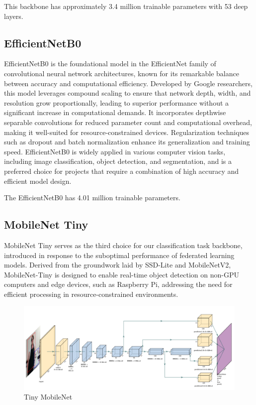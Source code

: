 \documentclass[runningheads,a4paper,11pt]{report}
\begin{document}
This backbone has approximately 3.4 million trainable parameters with 53 deep layers.
\subsection{EfficientNetB0}

EfficientNetB0 is the foundational model in the EfficientNet family of convolutional neural network architectures, known for its remarkable balance between accuracy and computational efficiency. Developed by Google researchers, this model leverages compound scaling to ensure that network depth, width, and resolution grow proportionally, leading to superior performance without a significant increase in computational demands. It incorporates depthwise separable convolutions for reduced parameter count and computational overhead, making it well-suited for resource-constrained devices. Regularization techniques such as dropout and batch normalization enhance its generalization and training speed. EfficientNetB0 is widely applied in various computer vision tasks, including image classification, object detection, and segmentation, and is a preferred choice for projects that require a combination of high accuracy and efficient model design.

The EfficientNetB0 has 4.01 million trainable parameters.

\subsection{MobileNet Tiny}

MobileNet Tiny serves as the third choice for our classification task backbone, introduced in response to the suboptimal performance of federated learning models. Derived from the groundwork laid by SSD-Lite and MobileNetV2, MobileNet-Tiny is designed to enable real-time object detection on non-GPU computers and edge devices, such as Raspberry Pi, addressing the need for efficient processing in resource-constrained environments.

\begin{figure}[h]
    \centering
    \includegraphics[scale=0.5]{images/tiny.png} 
    \caption{Tiny MobileNet}
\end{figure}
\end{document}
